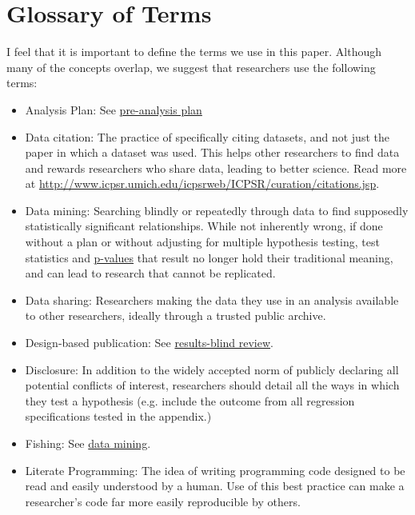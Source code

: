\documentclass[12pt] {article}
\begin{document}
\section{Glossary of Terms}
I feel that it is important to define the terms we use in this paper. Although many of the concepts overlap, we suggest that researchers use the following terms:
\begin{itemize}
\item
Analysis Plan: See \hyperref[def-pap]{pre-analysis plan}

\item
Data citation: The practice of specifically citing datasets, and not just the paper in which a dataset was used.  This helps other researchers to find data and rewards researchers who share data, leading to better science. Read more at \url{http://www.icpsr.umich.edu/icpsrweb/ICPSR/curation/citations.jsp}. 

\item \label{def-mining}
Data mining: Searching blindly or repeatedly through data to find supposedly statistically significant relationships. While not inherently wrong, if done without a plan or without adjusting for multiple hypothesis testing, test statistics and \hyperref[def-pvalue]{p-values} that result no longer hold their traditional meaning, and can lead to research that cannot be replicated.

\item \label{def-datasharing}
Data sharing: Researchers making the data they use in an analysis available to other researchers, ideally through a trusted public archive. 

\item\label{def-dbp}
Design-based publication: See \hyperref[def-rbr]{results-blind review}.

\item
Disclosure: In addition to the widely accepted norm of publicly declaring all potential conflicts of interest, researchers should detail all the ways in which they test a hypothesis (e.g. include the outcome from all regression specifications tested in the appendix.)

\item
Fishing: See \hyperref[def-mining]{data mining}.

\item
Literate Programming: The idea of writing programming code designed to be read and easily understood by a human. Use of this best practice can make a researcher’s code far more easily reproducible by others.


\end{itemize}
\end{document}

